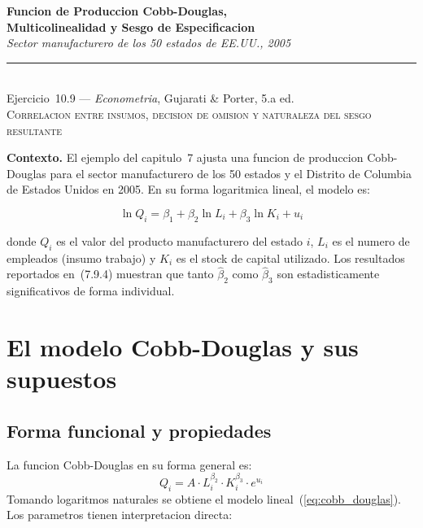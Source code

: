 \documentclass[12pt, letterpaper]{article}
\theoremstyle{remark}
\begin{document}
\begin{center}
  {\LARGE\bfseries Funcion de Produccion Cobb-Douglas,}\\[6pt]
  {\LARGE\bfseries Multicolinealidad y Sesgo de Especificacion}\\[12pt]
  {\large\itshape Sector manufacturero de los 50 estados de EE.UU., 2005}\\[14pt]
  \rule{0.55\linewidth}{0.6pt}\\[8pt]
  {\normalsize Ejercicio~10.9 --- \textit{Econometria}, Gujarati \& Porter, 5.a ed.}\\[4pt]
  {\small\textsc{Correlacion entre insumos, decision de omision y naturaleza del sesgo resultante}}
\end{center}

\vspace{10pt}

\noindent\textbf{Contexto.}\quad
El ejemplo del capitulo~7 ajusta una funcion de produccion Cobb-Douglas para
el sector manufacturero de los 50 estados y el Distrito de Columbia de
Estados Unidos en 2005. En su forma logaritmica lineal, el modelo es:

\begin{equation}
  \ln Q_i = \beta_1 + \beta_2 \ln L_i + \beta_3 \ln K_i + u_i
  \label{eq:cobb_douglas}
\end{equation}

\noindent donde $Q_i$ es el valor del producto manufacturero del estado $i$,
$L_i$ es el numero de empleados (insumo trabajo) y $K_i$ es el stock de
capital utilizado. Los resultados reportados en~(7.9.4) muestran que tanto
$\hat\beta_2$ como $\hat\beta_3$ son estadisticamente significativos de forma
individual.

\section{El modelo Cobb-Douglas y sus supuestos}

\subsection{Forma funcional y propiedades}

La funcion Cobb-Douglas en su forma general es:
\begin{equation}
  Q_i = A \cdot L_i^{\beta_2} \cdot K_i^{\beta_3} \cdot e^{u_i}
  \label{eq:cd_nivel}
\end{equation}
Tomando logaritmos naturales se obtiene el modelo lineal~(\ref{eq:cobb_douglas}).
Los parametros tienen interpretacion directa:
\end{document}
